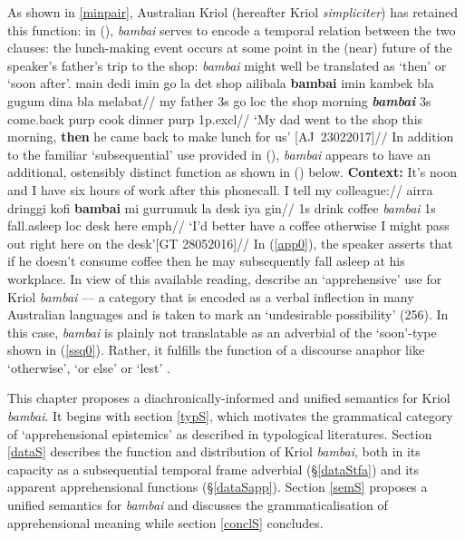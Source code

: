 \documentclass[11pt]{article}
\begin{document}
As shown in \ref{minpair}, Australian Kriol (hereafter Kriol \textit{simpliciter}) has retained this function: in (), \textit{bambai} serves to encode a temporal relation between the two clauses: the lunch-making event occurs at some point in the (near) future of the speaker's father's trip to the shop: \textit{bambai }might well be translated as `then' or `soon after'.
\pex{}\begingl
\gla main dedi imin go la det shop ailibala \textbf{bambai} imin kambek bla gugum dina bla melabat//
\glb my father 3s go {\sc loc} the shop morning \textit{\textbf{bambai}} 3s come.back {\sc purp} cook dinner {\sc purp} 1p{\sc.excl}//
\glft`My dad went to the shop this morning, \textbf{then} he came back to make lunch for us' \hspace*{\fill}[AJ~23022017]//
\endgl\xe
In addition to the familiar `subsequential' use provided in (), \textit{bambai} appears to have an additional, ostensibly distinct function as shown in () below.
\pex{}\begingl
\glpreamble\textbf{Context:}  It's noon and I have six hours of work after this phonecall. I tell my colleague://
\gla ai\textdblhyphen{}rra dringgi kofi \textbf{bambai} mi gurrumuk la desk iya gin//
\glb 1s drink coffee \textit{bambai} 1s fall.asleep {\sc loc} desk here {\sc emph}//
\glft `I'd better have a coffee otherwise I might pass out right here on the desk'\hfill[GT 28052016]//
\endgl
\xe
In (\ref{app0}), the speaker asserts that if he doesn't consume coffee then he may subsequently fall asleep at his workplace. In view of this available reading, \citet{Angelo2016} describe an `apprehensive' use for Kriol \textit{bambai} --- a category that is encoded as a verbal inflection in many Australian languages and is taken to mark an `undesirable possibility' (256). In this case, \textit{bambai} is plainly not translatable as an adverbial of the `soon'-type shown in (\ref{ssq0}). Rather, it fulfills the function of a discourse anaphor like `otherwise', `or else' or `lest' \citep[see also][]{Webber2001,PhilKotek}.

This chapter proposes a diachronically-informed and unified semantics for Kriol \textit{bambai}. It begins with section \ref{typS}, which motivates the grammatical category of `apprehensional epistemics' as described in typological literatures. Section \ref{dataS} describes the function and distribution of Kriol \textit{bambai}, both in its capacity as a subsequential temporal frame adverbial (§\ref{dataStfa}) and its apparent apprehensional functions (§\ref{dataSapp}). Section \ref{semS} proposes a unified semantics for \textit{bambai} and discusses the grammaticalisation of apprehensional meaning while section \ref{conclS} concludes.
\end{document}
